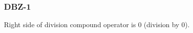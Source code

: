 \subsubsection{DBZ-1}\label{sec:error_code_dbz_1}

Right side of division compound operator is 0 (division by 0).


